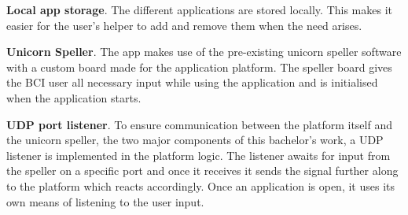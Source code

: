 \vspace*{2mm}
\textbf{Local app storage}. The different applications are stored locally. This makes it easier for the user's helper to add and remove them when the need arises.

\vspace*{2mm}
\textbf{Unicorn Speller}. The app makes use of the pre-existing unicorn speller software with a custom board made for the application platform. The speller board gives the BCI user all necessary input while using the application and is initialised when the application starts.

\vspace*{2mm}
\textbf{UDP port listener}. To ensure communication between the platform itself and the unicorn speller, the two major components of this bachelor's work, a UDP listener is implemented in the platform logic. The listener awaits for input from the speller on a specific port and once it receives it sends the signal further along to the platform which reacts accordingly. Once an application is open, it uses its own means of listening to the user input.